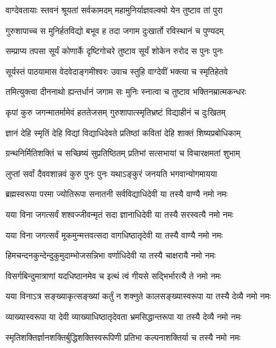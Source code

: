 

\twolineshloka
{वाग्देवतायाः स्तवनं श्रूयतां सर्वकामदम्}
{महामुनिर्याज्ञवल्क्यो येन तुष्टाव तां पुरा}%

\twolineshloka
{गुरुशापाच्च स मुनिर्हतविद्यो बभूव ह}
{तदा जगाम दुःखार्तो रविस्थानं च पुण्यदम्}%

\twolineshloka
{सम्प्राप्य तपसा सूर्यं कोणार्के दृष्टिगोचरे}
{तुष्टाव सूर्यं शोकेन रुरोद स पुनः पुनः}%

\twolineshloka
{सूर्यस्तं पाठयामास वेदवेदाङ्गमीश्वरः}
{उवाच स्तुहि वाग्देवीं भक्त्या च स्मृतिहेतवे}%

\twolineshloka
{तमित्युक्त्वा दीननाथो ह्यन्तर्धानं जगाम सः}
{मुनिः स्नात्वा च तुष्टाव भक्तिनम्रात्मकन्धरः}%

\twolineshloka
{कृपां कुरु जगन्मातर्मामेवं हततेजसम्}
{गुरुशापात्स्मृतिभ्रष्टं विद्याहीनं च दुःखितम्}%

\twolineshloka
{ज्ञानं देहि स्मृतिं देहि विद्यां विद्याधिदेवते}
{प्रतिष्ठां कवितां देहि शाक्तं शिष्यप्रबोधिकाम्}%

\twolineshloka
{ग्रन्थनिर्मितिशक्तिं च सच्छिष्यं सुप्रतिष्ठितम्}
{प्रतिभां सत्सभायां च विचारक्षमतां शुभाम्}%

\twolineshloka
{लुप्तां सर्वां दैववशान्नवं कुरु पुनः पुनः}
{यथाऽङ्कुरं जनयति भगवान्योगमायया}%

\twolineshloka
{ब्रह्मस्वरूपा परमा ज्योतिरूपा सनातनी}
{सर्वविद्याधिदेवी या तस्यै वाण्यै नमो नमः}%

\twolineshloka
{यया विना जगत्सर्वं शश्वज्जीवन्मृतं सदा}
{ज्ञानाधिदेवी या तस्यै सरस्वत्यै नमो नमः}%

\twolineshloka
{यया विना जगत्सर्वं मूकमुन्मत्तवत्सदा}
{वागधिष्ठातृदेवी या तस्यै वाण्यै नमो नमः}%

\twolineshloka
{हिमचन्दनकुन्देन्दुकुमुदाम्भोजसन्निभा}
{वर्णाधिदेवी या तस्यै चाक्षरायै नमो नमः}%

\twolineshloka
{विसर्गबिन्दुमात्राणां यदधिष्ठानमेव च}
{इत्थं त्वं गीयसे सद्भिर्भारत्यै ते नमो नमः}%

\twolineshloka
{यया विनाऽत्र सङ्ख्याकृत्सङ्ख्यां कर्तुं न शक्नुते}
{कालसङ्ख्यास्वरूपा या तस्यै देव्यै नमो नमः}%

\twolineshloka
{व्याख्यास्वरूपा या देवी व्याख्याधिष्ठातृदेवता}
{भ्रमसिद्धान्तरूपा या तस्यै देव्यै नमो नमः}%

\twolineshloka
{स्मृतिशक्तिर्ज्ञानशक्तिर्बुद्धिशक्तिस्वरूपिणी}
{प्रतिभा कल्पनाशक्तिर्या च तस्यै नमो नमः}%

